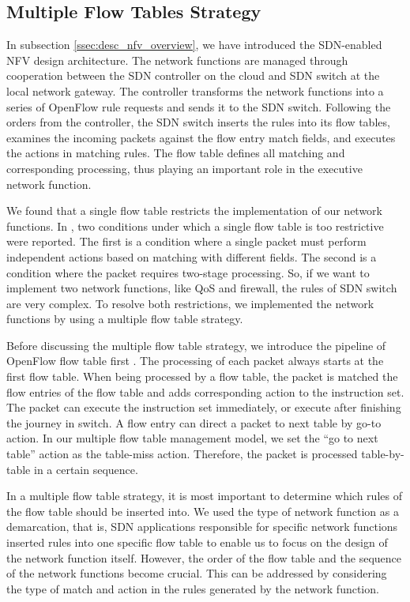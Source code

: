 \documentclass[conference]{IEEEtran}
\begin{document}
\subsection{Multiple Flow Tables Strategy}
In subsection \ref{ssec:desc_nfv_overview}, we have introduced the SDN-enabled NFV design architecture. The network functions are managed through cooperation between the SDN controller on the cloud and SDN switch at the local network gateway. The controller transforms the network functions into a series of OpenFlow rule requests and sends it to the SDN switch. Following the orders from the controller, the SDN switch inserts the rules into its flow tables, examines the incoming packets against the flow entry match fields, and executes the actions in matching rules. The flow table \cite{sdn-ft} defines all matching and corresponding processing, thus playing an important role in the executive network function.

We found that a single flow table restricts the implementation of our network functions. In \cite{multiple-flow-table}, two conditions under which a single flow table is too restrictive were reported. The first is a condition where a single packet must perform independent actions based on matching with different fields. The second is a condition where the packet requires two-stage processing. So, if we want to implement two network functions, like QoS and firewall, the rules of SDN switch are very complex. To resolve both restrictions, we implemented the network functions by using a multiple flow table strategy.

Before discussing the multiple flow table strategy, we introduce the pipeline of OpenFlow flow table first \cite{openflow-spec}. The processing of each packet always starts at the first flow table. When being processed by a flow table, the packet is matched the flow entries of the flow table and adds corresponding action to the instruction set. The packet can execute the instruction set immediately, or execute after finishing the journey in switch. A flow entry can direct a packet to next table by go-to action. In our multiple flow table management model, we set the ``go to next table'' action as the table-miss action. Therefore, the packet is processed table-by-table in a certain sequence.

In a multiple flow table strategy, it is most important to determine which rules of the flow table should be inserted into. We used the type of network function as a demarcation, that is, SDN applications responsible for specific network functions inserted rules into one specific flow table to enable us to focus on the design of the network function itself. However, the order of the flow table and the sequence of the network functions become crucial. This can be addressed by considering the type of match and action in the rules generated by the network function.
\end{document}
